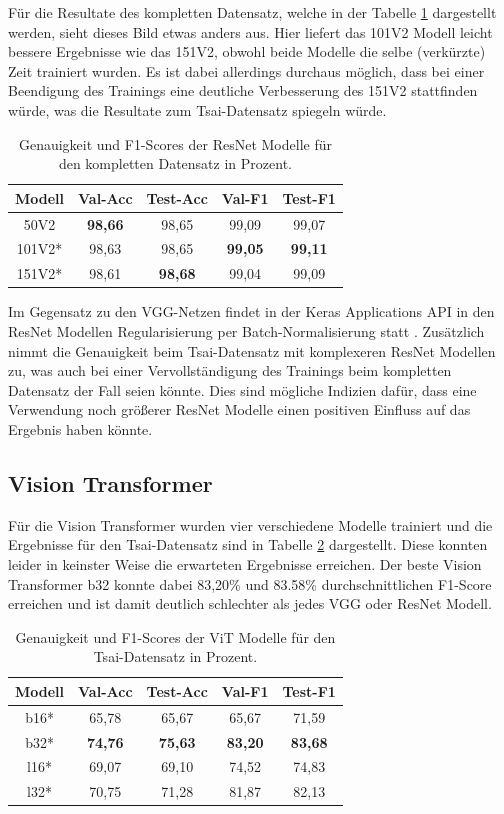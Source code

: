 \documentclass[twoside,a4paper]{IEEEtran}
\begin{document}
Für die Resultate des kompletten Datensatz, welche in der Tabelle \ref{resnet_ergebnis_full} dargestellt werden, sieht dieses Bild etwas anders aus. Hier liefert das 101V2 Modell leicht bessere Ergebnisse wie das 151V2, obwohl beide Modelle die selbe (verkürzte) Zeit trainiert wurden. Es ist dabei allerdings durchaus möglich, dass bei einer Beendigung des Trainings eine deutliche Verbesserung des 151V2 stattfinden würde, was die Resultate zum Tsai-Datensatz spiegeln würde.
\begin{table}[!htb]
	\caption{Genauigkeit und F1-Scores der ResNet Modelle für den kompletten Datensatz in Prozent.}
	\label{resnet_ergebnis_full}
	\centering
	\begin{tabular}{|c|c|c|c|c|}
		\hline
		Modell & Val-Acc & Test-Acc & Val-F1 & Test-F1\\
		\hline
		\hline 
		50V2 & \textbf{98,66} & 98,65 & 99,09 & 99,07\\
		\hline
		101V2* & 98,63 & 98,65 & \textbf{99,05} & \textbf{99,11}\\
		\hline
		151V2* & 98,61 & \textbf{98,68} & 99,04 & 99,09\\
		\hline 
	\end{tabular}
\end{table}

Im Gegensatz zu den VGG-Netzen findet in der Keras Applications API in den ResNet Modellen Regularisierung per Batch-Normalisierung statt \cite{resnet_keras}. Zusätzlich nimmt die Genauigkeit beim Tsai-Datensatz mit komplexeren ResNet Modellen zu, was auch bei einer Vervollständigung des Trainings beim kompletten Datensatz der Fall seien könnte. Dies sind mögliche Indizien dafür, dass eine Verwendung noch größerer ResNet Modelle einen positiven Einfluss auf das Ergebnis haben könnte.
\subsection{Vision Transformer}
Für die Vision Transformer wurden vier verschiedene Modelle trainiert und die Ergebnisse für den Tsai-Datensatz sind in Tabelle \ref{vit_ergebnis_tsai} dargestellt. Diese konnten leider in keinster Weise die erwarteten Ergebnisse erreichen. Der beste Vision Transformer b32 konnte dabei 83,20\% und 83.58\% durchschnittlichen F1-Score erreichen und ist damit deutlich schlechter als jedes VGG oder ResNet Modell.
\begin{table}[!htb]
	\caption{Genauigkeit und F1-Scores der ViT Modelle für den Tsai-Datensatz in Prozent.}
	\label{vit_ergebnis_tsai}
	\centering
	\begin{tabular}{|c|c|c|c|c|}
		\hline
		Modell & Val-Acc & Test-Acc & Val-F1 & Test-F1\\
		\hline
		\hline
		b16* & 65,78 & 65,67 & 65,67 & 71,59\\
		\hline
		b32* & \textbf{74,76} & \textbf{75,63} & \textbf{83,20} & \textbf{83,68}\\
		\hline
		l16* & 69,07 & 69,10 & 74,52 & 74,83\\
		\hline
		l32* & 70,75 & 71,28 & 81,87 & 82,13\\
		\hline 
	\end{tabular}
\end{table}
\end{document}
